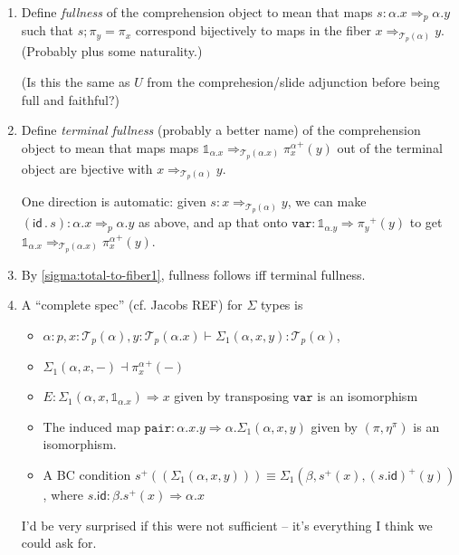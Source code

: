 \documentclass[10pt]{article}
\theoremstyle{definition}
\newcommand{\tcell}{\Rightarrow}
\newcommand{\id}{\mathsf{id}}
\newcommand\TrPlus[2]{\ensuremath{{#1}^+(#2)}}
\newcommand\El[2]{\mathcal{T}_{#1}(#2)}
\newcommand\bdot[0]{\mathbin{.}}
\newcommand\One{\ensuremath{\mathds{1}}}
\newcommand\mtt[1]{\mathtt{#1}}
\begin{document}
\begin{enumerate}
\item \label{sigma:full} Define \emph{fullness} of the comprehension
  object to mean that maps $s : \alpha.x \tcell_p \alpha.y$ such that
  $s;\pi_y = \pi_x$ correspond bijectively to maps in the fiber $x
  \tcell_{\El{p}{\alpha}} y$.  (Probably plus some naturality.)

  (Is this the same as $U$ from the comprehesion/slide adjunction before
  being full and faithful?)

\item \label{sigma:full-interesting} Define \emph{terminal fullness}
  (probably a better name) of the comprehension object to mean that maps
  maps $\One_{\alpha.x} \tcell_{\El{p}{\alpha.x}} \TrPlus{\pi^\alpha_x}{y}$
  out of the terminal object are bjective with $x
  \tcell_{\El{p}{\alpha}} y$.

  One direction is automatic: given $s : x \tcell_{\El{p}{\alpha}} y$,
  we can make $(\id \bdot s) : \alpha.x \tcell_p \alpha.y$ as above, and ap that
  onto $\mtt{var} : \One_{\alpha.y} \tcell \TrPlus{\pi_y}{y}$ to get
  $\One_{\alpha.x} \tcell_{\El{p}{\alpha.x}} \TrPlus{\pi^\alpha_x}{y}$.

\item By \ref{sigma:total-to-fiber1}, fullness follows iff terminal
  fullness.  
  
\item \label{sigma:complete}

  A ``complete spec'' (cf. Jacobs REF) for $\Sigma$ types is
  \begin{itemize}
  \item $\alpha : p, x : \El{p}{\alpha}, y : \El{p}{\alpha.x} \vdash \Sigma_1(\alpha,x,y) : \El{p}{\alpha}$,
  \item $\Sigma_1(\alpha,x,-) \dashv \TrPlus{\pi^\alpha_x}{-}$
  \item $E : \Sigma_1(\alpha,x,\One_{\alpha.x}) \tcell x$ given by
    transposing $\mtt{var}$ is an isomorphism
  \item The induced map $\mtt{pair} : \alpha.x.y \tcell
    \alpha.\Sigma_1(\alpha,x,y)$ given by $(\pi, \eta^\pi)$ is an
    isomorphism.
  \item A BC condition $\TrPlus{s}{(\Sigma_1(\alpha,x,y))} \equiv
    \Sigma_1(\beta,\TrPlus{s}{x}, \TrPlus{(s . \id)}{y})$,
    where $s.\id : \beta.\TrPlus{s}{x} \tcell \alpha.x$
  \end{itemize}
  I'd be very surprised if this were not sufficient -- it's everything I
  think we could ask for.


\end{enumerate}
\end{document}
